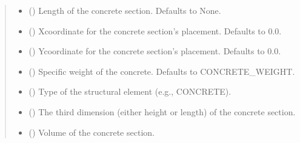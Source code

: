 \documentclass[a4paper,10pt,english]{sphinxmanual}
\begin{document}
\begin{fulllineitems}
\begin{quote}
\begin{description}
\begin{itemize}
\item {} 
\sphinxAtStartPar
{} (\sphinxstyleliteralemphasis{\sphinxupquote{, }}) \textendash{} Length of the concrete section. Defaults to None.

\item {} 
\sphinxAtStartPar
{} (\sphinxstyleliteralemphasis{\sphinxupquote{, }}) \textendash{} X\sphinxhyphen{}coordinate for the concrete section’s placement. Defaults to 0.0.

\item {} 
\sphinxAtStartPar
{} (\sphinxstyleliteralemphasis{\sphinxupquote{, }}) \textendash{} Y\sphinxhyphen{}coordinate for the concrete section’s placement. Defaults to 0.0.

\item {} 
\sphinxAtStartPar
{} (\sphinxstyleliteralemphasis{\sphinxupquote{, }}) \textendash{} Specific weight of the concrete. Defaults to CONCRETE\_WEIGHT.

\item {} 
\sphinxAtStartPar
{} (\sphinxstyleliteralemphasis{\sphinxupquote{, }}) \textendash{} Type of the structural element (e.g., CONCRETE).

\end{itemize}

\begin{itemize}
\item {} 
\sphinxAtStartPar
{} () \textendash{} The third dimension (either height or length) of the concrete section.

\item {} 
\sphinxAtStartPar
{} () \textendash{} Volume of the concrete section.


\end{itemize}
\end{description}
\end{quote}
\end{fulllineitems}
\end{document}
